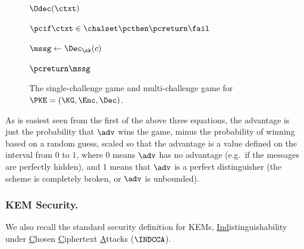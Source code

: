 \begin{figure}[t]
\begin{center}
{	  	  			\pchspace

	  	  			\begin{minipage}[t]{3cm}
	  	  				\underline{$\Odec(\ctxt)$}
	  	  				\begin{nicodemus}
                  \item $\pcif \ctxt \in \chalset \pcthen \pcreturn \fail$
                  \item $\mssg \gets \Dec_\sk(c)$
	  	  					\item $\pcreturn \mssg$
	  	  				\end{nicodemus}	
	  	  			\end{minipage}
	  	  		}
	  	  	\end{center}
	  	  	\caption{\label{fig:pke-games}
            The single-challenge \OWCPA game and multi-challenge \INDCCA
            game for $\PKE = (\KG, \Enc, \Dec)$.
          }
	  	  \end{figure}


      \noindent
      As is easiest seen from the first of the above three equations, the
        advantage is just the probability that $\adv$ wins the game, minus the
        probability of winning based on a random guess, scaled so that the
        advantage is a value defined on the interval from $0$ to $1$,
        where $0$ means $\adv$ has no advantage (e.g.\ if the messages are perfectly hidden),
        and $1$ means that $\adv$ is a perfect distinguisher (the scheme is
        completely broken, or $\adv$ is unbounded).

    \subsubsection{KEM Security.}
	    We also recall the standard security definition for KEMs,
	      \underline{Ind}istinguishability under \underline{C}hosen
        \underline{C}iphertext \underline{A}ttacks ($\INDCCA$).
	      
